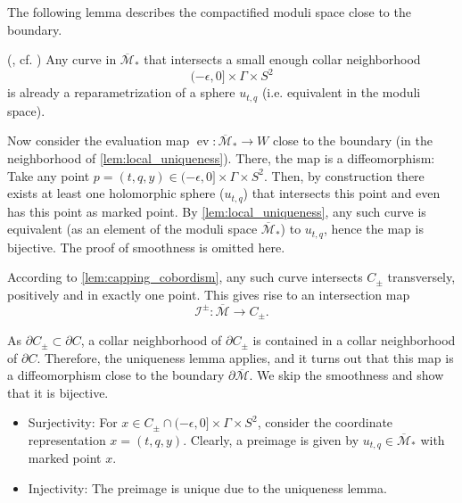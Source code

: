 The following lemma describes the compactified moduli space close to the boundary.
\begin{lemma}(\cite[Lemma 6.3]{BGM22}, cf. \cite[page 334]{MNW13})\label{lem:local_uniqueness}
    Any curve in $\overline{\mathcal M}_*$ that intersects a small enough collar neighborhood
    \[
        (-\epsilon, 0] \times \Gamma \times S^2
    \]
    is already a reparametrization of a sphere $u_{t,q}$ (i.e. equivalent in the moduli space).
\end{lemma}

Now consider the evaluation map $\operatorname{ev}\colon \overline{\mathcal M}_* \to W$ close to the boundary (in the neighborhood of \cref{lem:local_uniqueness}).
There, the map is a diffeomorphism: Take any point $p  = (t, q, y) \in (-\epsilon, 0] \times \Gamma \times S^2$. 
Then, by construction there exists at least one holomorphic sphere ($u_{t,q}$) that intersects this point
and even has this point as marked point.
By \cref{lem:local_uniqueness}, any such curve is equivalent (as an element of the moduli space $\overline{\mathcal M}_*$) to $u_{t,q}$, hence the map is bijective.
The proof of smoothness is omitted here.

According to \cref{lem:capping_cobordism}, any such curve intersects $C_\pm$ transversely, positively and in exactly one point.
This gives rise to an intersection map
\[
    \mathcal{I}^\pm\colon \overline{\mathcal{M}} \to C_\pm.
\]

As $\partial C_\pm \subset \partial C$, a collar neighborhood of $\partial C_\pm$ is contained in a collar neighborhood of $\partial C$.
Therefore, the uniqueness lemma applies, and it turns out that this map is a diffeomorphism close to the boundary $\partial \overline{\mathcal M}$.
We skip the smoothness and show that it is bijective.
\begin{itemize}
    \item Surjectivity: For $x \in C_\pm \cap (-\epsilon, 0] \times \Gamma \times S^2$, consider the coordinate representation $x = (t, q, y)$.
    Clearly, a preimage is given by $u_{t,q} \in \overline{\mathcal M}_*$ with marked point $x$. 
    \item Injectivity: The preimage is unique due to the uniqueness lemma.
\end{itemize}